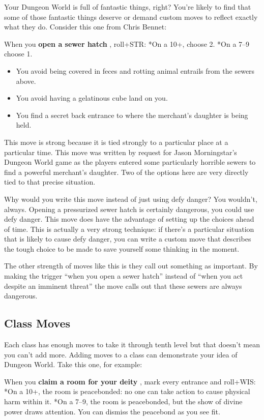  Your Dungeon World is full of fantastic things, right? You're likely to find that some of those fantastic things deserve or demand custom moves to reflect exactly what they do. Consider this one from Chris Bennet:


 When you \textbf{open a sewer hatch}
, roll+STR: *On a 10+, choose 2. *On a 7--9 choose 1.
\begin{itemize}
\item You avoid being covered in feces and rotting animal entrails from the sewers above.
\item You avoid having a gelatinous cube land on you.
\item You find a secret back entrance to where the merchant's daughter is being held.

\end{itemize}


 This move is strong because it is tied strongly to a particular place at a particular time. This move was written by request for Jason Morningstar's Dungeon World game as the players entered some particularly horrible sewers to find a powerful merchant's daughter. Two of the options here are very directly tied to that precise situation.


 Why would you write this move instead of just using defy danger? You wouldn't, always. Opening a pressurized sewer hatch is certainly dangerous, you could use defy danger. This move does have the advantage of setting up the choices ahead of time. This is actually a very strong technique: if there's a particular situation that is likely to cause defy danger, you can write a custom move that describes the tough choice to be made to save yourself some thinking in the moment.


 The other strength of moves like this is they call out something as important. By making the trigger ``when you open a sewer hatch'' instead of ``when you act despite an imminent threat'' the move calls out that these sewers are always dangerous.
\subsection{Class Moves}


 Each class has enough moves to take it through tenth level but that doesn't mean you can't add more. Adding moves to a class can demonstrate your idea of Dungeon World. Take this one, for example:


 When you \textbf{claim a room for your deity}
, mark every entrance and roll+WIS: *On a 10+, the room is peacebonded: no one can take action to cause physical harm within it. *On a 7--9, the room is peacebonded, but the show of divine power draws attention. You can dismiss the peacebond as you see fit.


